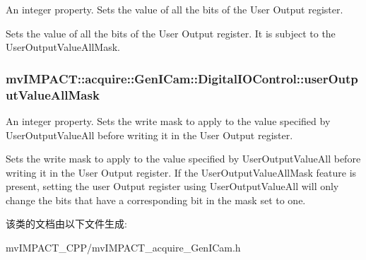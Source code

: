 An integer property. Sets the value of all the bits of the User Output register. 

Sets the value of all the bits of the User Output register. It is subject to the User\+Output\+Value\+All\+Mask. \hypertarget{classmv_i_m_p_a_c_t_1_1acquire_1_1_gen_i_cam_1_1_digital_i_o_control_aa33c5e4bfa78eb795e30bcdce7c72180}{
\subsubsection[{user\+Output\+Value\+All\+Mask}]{ mv\+I\+M\+P\+A\+C\+T\+::acquire\+::\+Gen\+I\+Cam\+::\+Digital\+I\+O\+Control\+::user\+Output\+Value\+All\+Mask}}\label{classmv_i_m_p_a_c_t_1_1acquire_1_1_gen_i_cam_1_1_digital_i_o_control_aa33c5e4bfa78eb795e30bcdce7c72180}


An integer property. Sets the write mask to apply to the value specified by User\+Output\+Value\+All before writing it in the User Output register. 

Sets the write mask to apply to the value specified by User\+Output\+Value\+All before writing it in the User Output register. If the User\+Output\+Value\+All\+Mask feature is present, setting the user Output register using User\+Output\+Value\+All will only change the bits that have a corresponding bit in the mask set to one. 

该类的文档由以下文件生成\+:\begin{DoxyCompactItemize}
\item 
mv\+I\+M\+P\+A\+C\+T\+\_\+\+C\+P\+P/mv\+I\+M\+P\+A\+C\+T\+\_\+acquire\+\_\+\+Gen\+I\+Cam.\+h\end{DoxyCompactItemize}

